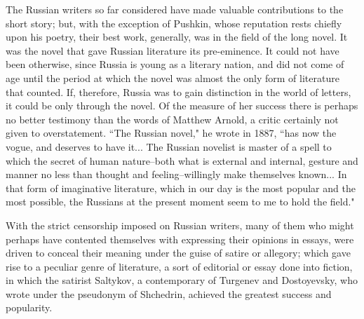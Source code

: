 The Russian writers so far considered have made valuable contributions
to the short story; but, with the exception of Pushkin, whose
reputation rests chiefly upon his poetry, their best work, generally,
was in the field of the long novel. It was the novel that gave Russian
literature its pre-eminence. It could not have been otherwise, since
Russia is young as a literary nation, and did not come of age until
the period at which the novel was almost the only form of literature
that counted. If, therefore, Russia was to gain distinction in the
world of letters, it could be only through the novel. Of the measure
of her success there is perhaps no better testimony than the words of
Matthew Arnold, a critic certainly not given to overstatement. ``The
Russian novel," he wrote in 1887, ``has now the vogue, and deserves to
have it... The Russian novelist is master of a spell to which the
secret of human nature--both what is external and internal, gesture
and manner no less than thought and feeling--willingly make themselves
known... In that form of imaginative literature, which in our day is
the most popular and the most possible, the Russians at the present
moment seem to me to hold the field."

With the strict censorship imposed on Russian writers, many of them
who might perhaps have contented themselves with expressing their
opinions in essays, were driven to conceal their meaning under the
guise of satire or allegory; which gave rise to a peculiar genre of
literature, a sort of editorial or essay done into fiction, in which
the satirist Saltykov, a contemporary of Turgenev and Dostoyevsky, who
wrote under the pseudonym of Shchedrin, achieved the greatest success
and popularity.

